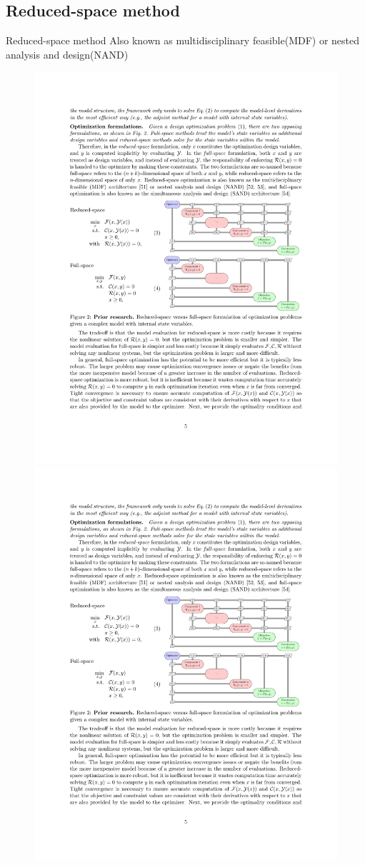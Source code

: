 \documentclass{beamer}
\begin{document}
\subsection{Reduced-space method}
  \begin{frame}{Reduced-space method}
    Also known as multidisciplinary feasible(MDF) or nested analysis and design(NAND)
    \begin{figure}[ht]
      \centering
      \vspace{0mm}
      \includegraphics[width=.9\linewidth]{Figures/red_space}
      \includegraphics[width=.3\linewidth]{Figures/red_space_eqns}
      \vspace{-5mm}
      \label{fig:model_evals}
    \end{figure}
  \end{frame}
\end{document}
